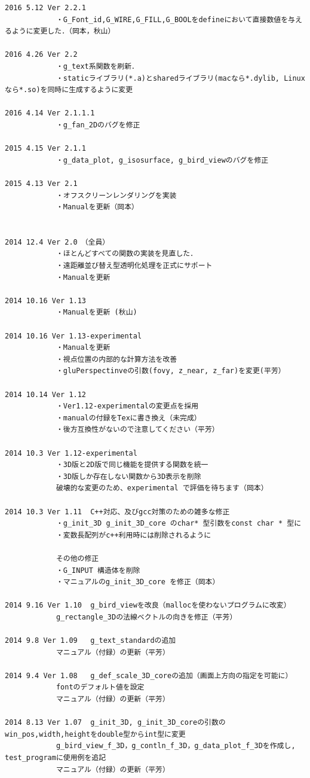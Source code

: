 \documentclass[platex,a4paper,12pt]{jsarticle}%
\begin{document}
\begin{verbatim}
2016 5.12 Ver 2.2.1
			・G_Font_id,G_WIRE,G_FILL,G_BOOLをdefineにおいて直接数値を与えるように変更した．（岡本，秋山）
			
2016 4.26 Ver 2.2
			・g_text系関数を刷新．
			・staticライブラリ(*.a)とsharedライブラリ(macなら*.dylib, Linuxなら*.so)を同時に生成するように変更
			
2016 4.14 Ver 2.1.1.1
			・g_fan_2Dのバグを修正

2015 4.15 Ver 2.1.1
			・g_data_plot, g_isosurface, g_bird_viewのバグを修正

2015 4.13 Ver 2.1   
			・オフスクリーンレンダリングを実装
			・Manualを更新（岡本）


2014 12.4 Ver 2.0　（全員）
			・ほとんどすべての関数の実装を見直した．
			・遠距離並び替え型透明化処理を正式にサポート
			・Manualを更新
			
2014 10.16 Ver 1.13
			・Manualを更新 (秋山)

2014 10.16 Ver 1.13-experimental
			・Manualを更新
			・視点位置の内部的な計算方法を改善
			・gluPerspectinveの引数(fovy, z_near, z_far)を変更(平芳）

2014 10.14 Ver 1.12
			・Ver1.12-experimentalの変更点を採用
			・manualの付録をTexに書き換え（未完成）
			・後方互換性がないので注意してください（平芳）

2014 10.3 Ver 1.12-experimental
			・3D版と2D版で同じ機能を提供する関数を統一
			・3D版しか存在しない関数から3D表示を削除
			破壊的な変更のため、experimental で評価を待ちます（岡本）

2014 10.3 Ver 1.11	C++対応、及びgcc対策のための雑多な修正
			・g_init_3D g_init_3D_core のchar* 型引数をconst char * 型に
			・変数長配列がc++利用時には削除されるように

			その他の修正
			・G_INPUT 構造体を削除
			・マニュアルのg_init_3D_core を修正（岡本）

2014 9.16 Ver 1.10	g_bird_viewを改良（mallocを使わないプログラムに改変）
			g_rectangle_3Dの法線ベクトルの向きを修正（平芳）

2014 9.8 Ver 1.09	g_text_standardの追加
			マニュアル（付録）の更新（平芳）

2014 9.4 Ver 1.08	g_def_scale_3D_coreの追加（画面上方向の指定を可能に）
			fontのデフォルト値を設定
			マニュアル（付録）の更新（平芳）

2014 8.13 Ver 1.07	g_init_3D, g_init_3D_coreの引数のwin_pos,width,heightをdouble型からint型に変更
			g_bird_view_f_3D，g_contln_f_3D，g_data_plot_f_3Dを作成し, test_programに使用例を追記
			マニュアル（付録）の更新（平芳）


\end{verbatim}
\end{document}
